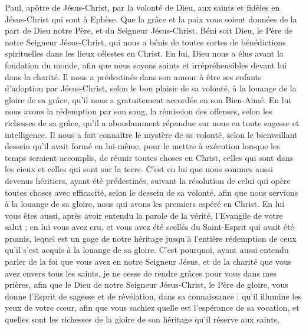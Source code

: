 \par\nobreak\noindent\hrulefill
\begin{multicols}{2}
\TextTitle{[Salutations]}
\VerseOne{}Paul, apôtre de Jésus-Christ, par la volonté de Dieu, aux saints et fidèles en Jésus-Christ qui sont à Ephèse.
Que la grâce et la paix vous soient données de la part de Dieu notre Père, et du Seigneur Jésus-Christ.
Béni soit Dieu, le Père de notre Seigneur Jésus-Christ, qui nous a bénis de toutes sortes de bénédictions spirituelles dans les lieux célestes en Christ.
En lui, Dieu nous a élus avant la fondation du monde, afin que nous soyons saints et irrépréhensibles devant lui dans la charité.
Il nous a prédestinés dans son amour à être ses enfants d’adoption par Jésus-Christ, selon le bon plaisir de sa volonté,
à la louange de la gloire de sa grâce, qu’il nous a gratuitement accordée en son Bien-Aimé.
En lui nous avons la rédemption par son sang, la rémission des offenses, selon les richesses de sa grâce,
qu’il a abondamment répandue sur nous en toute sagesse et intelligence.
Il nous a fait connaître le mystère de sa volonté, selon le bienveillant dessein qu’il avait formé en lui-même,
pour le mettre à exécution lorsque les temps seraient accomplis, de réunir toutes choses en Christ, celles qui sont dans les cieux et celles qui sont sur la terre.
C’est en lui que nous sommes aussi devenus héritiers, ayant été prédestinés, suivant la résolution de celui qui opère toutes choses avec efficacité, selon le dessein de sa volonté,
afin que nous servions à la louange de sa gloire, nous qui avons les premiers espéré en Christ.
En lui vous êtes aussi, après avoir entendu la parole de la vérité, l'Evangile de votre salut ; en lui vous avez cru, et vous avez été scellés du Saint-Esprit qui avait été promis,
lequel est un gage de notre héritage jusqu'à l’entière rédemption de ceux qu'il s’est acquis à la louange de sa gloire.
C'est pourquoi, ayant aussi entendu parler de la foi que vous avez en notre Seigneur Jésus, et de la charité que vous avez envers tous les saints,
je ne cesse de rendre grâces pour vous dans mes prières,
afin que le Dieu de notre Seigneur Jésus-Christ, le Père de gloire, vous donne l'Esprit de sagesse et de révélation, dans sa connaissance ;
qu'il illumine les yeux de votre cœur, afin que vous sachiez quelle est l'espérance de sa vocation, et quelles sont les richesses de la gloire de son héritage qu’il réserve aux saints,

\end{multicols}

